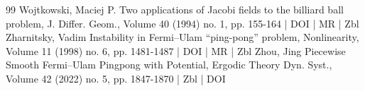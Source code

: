 \documentclass[10pt]{amsart}
\theoremstyle{definition}\newtheorem{defi}[theo]{Definition}\newtheorem{rema}[theo]{Remark}\newtheorem{exam}[theo]{Example}\newtheorem{exem}[theo]{Example}\newtheorem{nota}[theo]{Notation}
\begin{document}
\begin{thebibliography}{99}
Wojtkowski, Maciej P. Two applications of Jacobi fields to the billiard ball problem, J. Differ. Geom., Volume 40 (1994) no. 1, pp. 155-164 | DOI | MR | Zbl
Zharnitsky, Vadim Instability in Fermi–Ulam “ping-pong” problem, Nonlinearity, Volume 11 (1998) no. 6, pp. 1481-1487 | DOI | MR | Zbl
Zhou, Jing Piecewise Smooth Fermi–Ulam Pingpong with Potential, Ergodic Theory Dyn. Syst., Volume 42 (2022) no. 5, pp. 1847-1870 | Zbl | DOI
\end{thebibliography}
\end{document}
